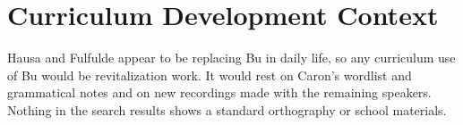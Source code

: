 \documentclass[12pt]{article}
\begin{document}
\section{Curriculum Development Context}
Hausa and Fulfulde appear to be replacing Bu in daily life, so any curriculum use of Bu would be revitalization work. It would rest on Caron's wordlist and grammatical notes and on new recordings made with the remaining speakers. Nothing in the search results shows a standard orthography or school materials.
\end{document}
